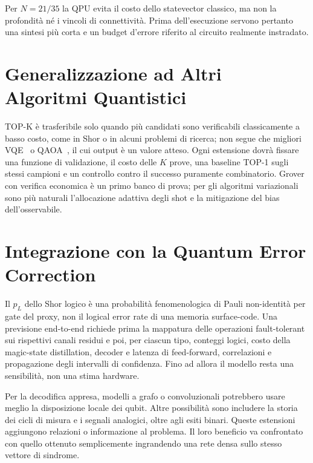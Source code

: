 \begin{onehalfspace}
Per $N=21/35$ la QPU evita il costo dello statevector classico, ma non la
profondità né i vincoli di connettività. Prima dell'esecuzione servono pertanto
una sintesi più corta e un budget d'errore riferito al circuito realmente
instradato.

\section{Generalizzazione ad Altri Algoritmi Quantistici}
\label{sec:altri_algoritmi}

TOP-K è trasferibile solo quando più candidati sono verificabili classicamente
a basso costo, come in Shor o in alcuni problemi di ricerca; non segue che
migliori VQE~\cite{peruzzo2014} o QAOA~\cite{farhi2014}, il cui output è un
valore atteso. Ogni estensione dovrà fissare una funzione di validazione, il
costo delle $K$ prove, una baseline TOP-1 sugli stessi campioni e un controllo
contro il successo puramente combinatorio. Grover con verifica economica è un
primo banco di prova; per gli algoritmi variazionali sono più naturali
l'allocazione adattiva degli shot e la mitigazione del bias dell'osservabile.

\section{Integrazione con la Quantum Error Correction}
\label{sec:qec_integrazione}

Il $p_L$ dello Shor logico è una probabilità fenomenologica di Pauli
non-identità per gate del proxy, non il logical error rate di una memoria
surface-code. Una previsione end-to-end richiede prima la mappatura delle
operazioni fault-tolerant sui rispettivi canali residui e poi, per ciascun
tipo, conteggi logici, costo della magic-state distillation, decoder e latenza
di feed-forward, correlazioni e propagazione degli intervalli di confidenza.
Fino ad allora il modello resta una sensibilità, non una stima hardware.

Per la decodifica appresa, modelli a grafo o convoluzionali potrebbero usare meglio la disposizione locale dei qubit. Altre possibilità sono includere la storia dei cicli di misura e i segnali analogici, oltre agli esiti binari. Queste estensioni aggiungono relazioni o informazione al problema. Il loro beneficio va confrontato con quello ottenuto semplicemente ingrandendo una rete densa sullo stesso vettore di sindrome.


\end{onehalfspace}
